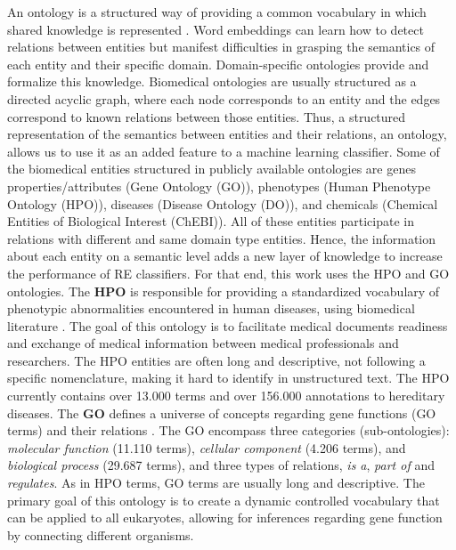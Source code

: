 An ontology is a structured way of providing a common vocabulary in which shared knowledge is represented \citep{Gruber}. Word embeddings can learn how to detect relations between entities but manifest difficulties in grasping the semantics of each entity and their specific domain. Domain-specific ontologies provide and formalize this knowledge. Biomedical ontologies are usually structured as a directed acyclic graph, where each node corresponds to an entity and the edges correspond to known relations between those entities. Thus, a structured representation of the semantics between entities and their relations, an ontology, allows us to use it as an added feature to a machine learning classifier. Some of the biomedical entities structured in publicly available ontologies are genes properties/attributes (Gene Ontology (GO)), phenotypes (Human Phenotype Ontology (HPO)), diseases (Disease Ontology (DO)), and chemicals (Chemical Entities of Biological Interest (ChEBI)). All of these entities participate in relations with different and same domain type entities. Hence, the information about each entity on a semantic level adds a new layer of knowledge to increase the performance of RE classifiers. For that end, this work uses the HPO and GO ontologies. The \textbf{HPO} is responsible for providing a standardized vocabulary of phenotypic abnormalities encountered in human diseases, using biomedical literature \citep{HPO}. The goal of this ontology is to facilitate medical documents readiness and exchange of medical information between medical professionals and researchers. The HPO entities are often long and descriptive, not following a specific nomenclature, making it hard to identify in unstructured text. The HPO currently contains over 13.000 terms and over 156.000 annotations to hereditary diseases. The \textbf{GO} defines a universe of concepts regarding gene functions (GO terms) and their relations \citep{GO}. The GO encompass three categories (sub-ontologies): \textit{molecular function} (11.110 terms), \textit{cellular component} (4.206 terms), and \textit{biological process} (29.687 terms), and three types of relations, \textit{is a}, \textit{part of} and \textit{regulates}. As in HPO terms, GO terms are usually long and descriptive. The primary goal of this ontology is to create a dynamic controlled vocabulary that can be applied to all eukaryotes, allowing for inferences regarding gene function by connecting different organisms.


